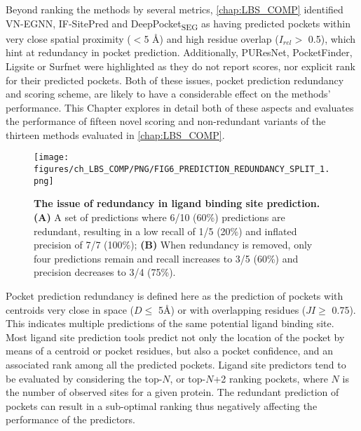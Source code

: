 Beyond ranking the methods by several metrics, \autoref{chap:LBS_COMP} identified VN-EGNN, IF-SitePred and DeepPocket\textsubscript{SEG} as having predicted pockets within very close spatial proximity ($<$5 \AA{}) and high residue overlap ($I_{rel} >$ 0.5), which hint at redundancy in pocket prediction. Additionally, PUResNet, PocketFinder, Ligsite or Surfnet were highlighted as they do not report scores, nor explicit rank for their predicted pockets. Both of these issues, pocket prediction redundancy and scoring scheme, are likely to have a considerable effect on the methods' performance. This Chapter explores in detail both of these aspects and evaluates the performance of fifteen novel scoring and non-redundant variants of the thirteen methods evaluated in \autoref{chap:LBS_COMP}.

\begin{figure}[htb!]
    \centering
    \texttt{[image: figures/ch\_LBS\_COMP/PNG/FIG6\_PREDICTION\_REDUNDANCY\_SPLIT\_1.png]}
    \caption[The issue of redundancy in ligand binding site prediction]{\textbf{The issue of redundancy in ligand binding site prediction.} \textbf{(A)} A set of predictions where 6/10 (60\%) predictions are redundant, resulting in a low recall of 1/5 (20\%) and inflated precision of 7/7 (100\%); \textbf{(B)} When redundancy is removed, only four predictions remain and recall increases to 3/5 (60\%) and precision decreases to 3/4 (75\%).}
    \label{fig:prediction_redundancy}
\end{figure}

Pocket prediction redundancy is defined here as the prediction of pockets with centroids very close in space ($D \leq$ 5\AA{}) or with overlapping residues ($JI \geq$ 0.75). This indicates multiple predictions of the same potential ligand binding site. Most ligand site prediction tools predict not only the location of the pocket by means of a centroid or pocket residues, but also a pocket confidence, and an associated rank among all the predicted pockets. Ligand site predictors tend to be evaluated by considering the top-$N$, or top-$N$+2 ranking pockets, where $N$ is the number of observed sites for a given protein. The redundant prediction of pockets can result in a sub-optimal ranking thus negatively affecting the performance of the predictors.

